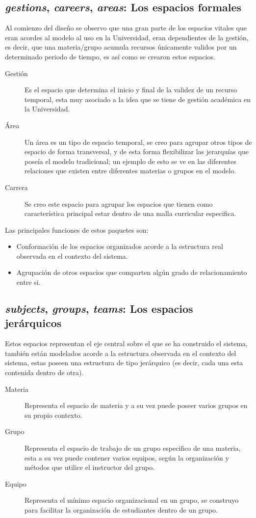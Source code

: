 \subsection{\emph{gestions}, \emph{careers}, \emph{areas}: Los espacios
formales}
Al comienzo del diseño se observo que una gran parte de los espacios vitales que
eran acordes al modelo al uso en la Universidad, eran dependientes de la
gestión, es decir, que una materia/grupo acumula recursos únicamente validos por
un determinado periodo de tiempo, es así como se crearon estos espacios.

\begin{description}
\item [Gestión] Es el espacio que determina el inicio y final de la validez de
un recurso temporal, esta muy asociado a la idea que se tiene de gestión
académica en la Universidad.
\item [Área] Un área es un tipo de espacio temporal, se creo para agrupar otros
tipos de espacio de forma transversal, y de esta forma flexibilizar las
jerarquías que poseía el modelo tradicional; un ejemplo de esto se ve en las
diferentes relaciones que existen entre diferentes materias o grupos en el
modelo.
\item [Carrera] Se creo este espacio para agrupar los espacios que tienen como
característica principal estar dentro de una malla curricular especifica.
\end{description}

Las principales funciones de estos paquetes son:

\begin{itemize}
\item Conformación de los espacios organizados acorde a la estructura real
observada en el contexto del sistema.
\item Agrupación de otros espacios que comparten algún grado de relacionamiento
entre si.
\end{itemize}

\subsection{\emph{subjects}, \emph{groups}, \emph{teams}: Los espacios
jerárquicos}
Estos espacios representan el eje central sobre el que se ha construido el
sistema, también están modelados acorde a la estructura observada en el contexto
del sistema, estas poseen una estructura de tipo jerárquico (es decir, cada una
esta contenida dentro de otra).

\begin{description}
\item [Materia] Representa el espacio de materia y a su vez puede poseer varios
grupos en su propio contexto.
\item [Grupo] Representa el espacio de trabajo de un grupo especifico de una
materia, esta a su vez puede contener varios equipos, según la organización y
métodos que utilice el instructor del grupo.
\item [Equipo] Representa el mínimo espacio organizacional en un grupo, se
construyo para facilitar la organización de estudiantes dentro de un grupo.
\end{description}


